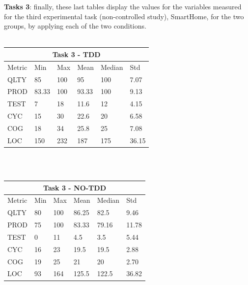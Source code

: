 \textbf{Tasks 3}: finally, these last tables display the values for the variables measured for the third experimental task (non-controlled study), SmartHome, for the two groups, by applying each of the two conditions.
\\ \  \\
\noindent
\begin{tabular}{ |p{2cm}||p{1.6cm}|p{1.6cm}|p{1.6cm}|p{1.6cm}|p{1.6cm}|}
    \hline
        \multicolumn{6}{|c|}{Task 3 - TDD} \\
    \hline
        Metric & Min & Max & Mean & Median & Std\\
    \hline
        QLTY & 85 & 100 & 95 & 100 & 7.07 \\
        PROD & 83.33 & 100 & 93.33 & 100 & 9.13 \\
        TEST & 7 & 18 & 11.6 & 12 & 4.15 \\
        CYC & 15 & 30 & 22.6 & 20 & 6.58 \\
        COG & 18 & 34 & 25.8 & 25 & 7.08 \\
        LOC & 150 & 232 & 187 & 175 & 36.15 \\
    \hline
\end{tabular}
\\ \  \\
\noindent
\begin{tabular}{ |p{2cm}||p{1.6cm}|p{1.6cm}|p{1.6cm}|p{1.6cm}|p{1.6cm}|}
    \hline
        \multicolumn{6}{|c|}{Task 3 - NO-TDD} \\
    \hline
        Metric & Min & Max & Mean & Median & Std\\
    \hline
        QLTY & 80 & 100 & 86.25 & 82.5 & 9.46 \\
        PROD & 75 & 100 & 83.33 & 79.16 & 11.78 \\
        TEST & 0 & 11 & 4.5 & 3.5 & 5.44 \\
        CYC & 16 & 23 & 19.5 & 19.5 & 2.88 \\
        COG & 19 & 25 & 21 & 20 & 2.70 \\
        LOC & 93 & 164 & 125.5 & 122.5 & 36.82 \\
    \hline
\end{tabular}
\\ \  \\

